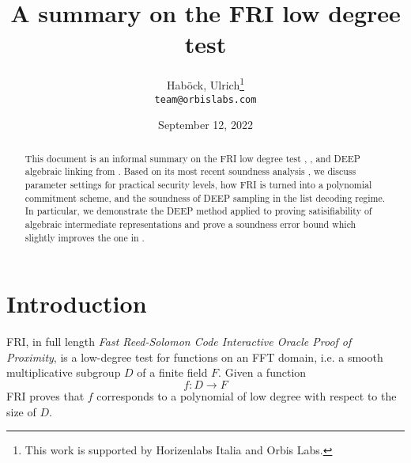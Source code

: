 \documentclass[11pt]{article}
\author{
    Hab{\"o}ck, Ulrich\thanks{This work is supported by Horizenlabs Italia and Orbis Labs.}
\\
    \texttt{team@orbislabs.com}
}
\theoremstyle{definition}
\theoremstyle{remark}
\begin{document}
\title{%
A summary on the FRI low degree test
%
}
\date{%
September 12, 2022
}
\maketitle



\begin{abstract}
This document is an informal summary on the FRI low degree test \cite{FRI}, \cite{ProximityGaps}, and DEEP algebraic linking from \cite{DEEPFRI}. 
Based on its most recent soundness analysis \cite{ProximityGaps}, we discuss parameter settings for practical security levels, how FRI is turned into a polynomial commitment scheme, and the soundness of DEEP sampling in the list decoding regime.
In particular, we demonstrate the DEEP method applied to proving satisifiability of algebraic intermediate representations and prove a soundness error bound which slightly improves  the one in \cite{ethSTARK}.
\end{abstract}


 \tableofcontents

\section{Introduction}
FRI, in full length \textit{Fast Reed-Solomon Code Interactive Oracle Proof of Proximity}, is a low-degree test for functions on an FFT domain, i.e. a smooth multiplicative subgroup $D$ of a finite field $F$.  
Given a function 
\[
f: D\longrightarrow F
\]
FRI proves that $f$ corresponds to a polynomial of low degree with respect to the size of $D$. 
\end{document}
